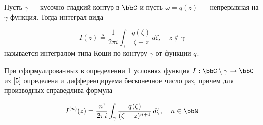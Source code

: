 \begin{defn}
Пусть $\gamma$ — кусочно-гладкий контур в $\bbC$ и пусть $\omega = q(z)$ — непрерывная на $\gamma$ функция. Тогда интеграл вида

\begin{equation} \label{5}
I(z) \triangleq \frac{1}{2 \pi i} \int_\gamma \frac{q(\zeta)}{\zeta - z}\,d\zeta, \quad z \notin \gamma
\end{equation}
называется интегралом типа Коши по контуру $\gamma$ от функции $q$.
\end{defn}

\begin{thm} \label{T2}
При сформулированных в определении 1 условиях функция $I:\bbC \setminus \gamma \to \bbC$ из $\eqref{5}$ определена и дифференцируема бесконечное число раз, причем для производных справедлива формула

\begin{equation} \label{6}
I^{(n)}(z) = \frac{n!}{2\pi i} \int_\gamma \frac{q(\zeta)}{(\zeta - z)^{n+1}}\,d\zeta, \quad n \in \bbN
\end{equation}
\end{thm}
